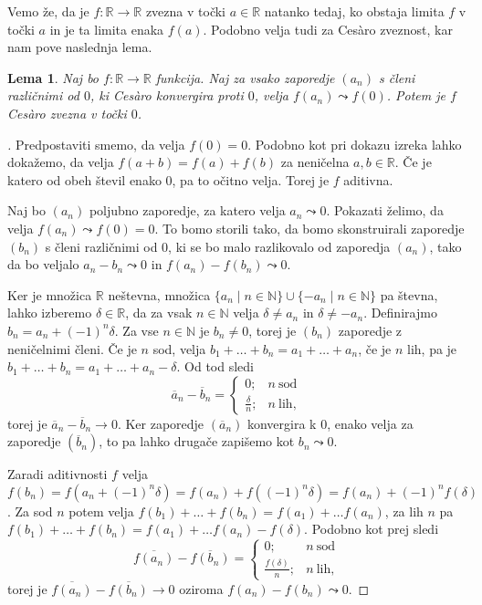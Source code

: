 \documentclass[a4paper,12pt]{article}
\def\N{\mathbb{N}}
\def\R{\mathbb{R}}
\theoremstyle{definition}
\theoremstyle{plain}
\newtheorem{lema}{Lema}
\newenvironment{dokaz}{\begin{proof}[\bfseries\upshape\proofname]}{\end{proof}}
\begin{document}
Vemo že, da je $f: \mathbb{R} \rightarrow \mathbb{R}$ zvezna v točki $a \in \mathbb{R}$ natanko tedaj, ko obstaja limita $f$ v točki $a$ in je ta limita enaka $f(a)$. Podobno velja tudi za Ces\`{a}ro zveznost, kar nam pove naslednja lema.
\begin{lema}
    Naj bo $f: \mathbb{R} \rightarrow \mathbb{R}$ funkcija. Naj za vsako zaporedje $(a_n)$ s členi različnimi od $0$, ki Ces\`{a}ro konvergira proti $0$, velja $f(a_n) \leadsto f(0)$. Potem je $f$ Ces\`{a}ro zvezna v točki $0$.
\end{lema}
\begin{dokaz}
    Predpostaviti smemo, da velja $f(0) = 0$. Podobno kot pri dokazu izreka lahko dokažemo, da velja $f(a+b) = f(a) + f(b)$ za neničelna $a, b \in \mathbb{R}$. Če je katero od obeh števil enako $0$, pa to očitno velja. Torej je $f$ aditivna. 
    
    Naj bo $(a_n)$ poljubno zaporedje, za katero velja $a_n \leadsto 0$. Pokazati želimo, da velja $f(a_n) \leadsto f(0) = 0$. To bomo storili tako, da bomo skonstruirali zaporedje $(b_n)$ s členi različnimi od $0$, ki se bo malo razlikovalo od zaporedja $(a_n)$, tako da bo veljalo $a_n - b_n \leadsto 0$ in $f(a_n) - f(b_n) \leadsto 0$.

    Ker je množica $\R$ neštevna, množica $\{a_n \mid n \in \N\} \cup \{-a_n \mid n \in \N\}$ pa števna, lahko izberemo $\delta \in \R$, da za vsak $n \in \N$ velja $\delta \neq a_n$ in $\delta \neq -a_n$. Definirajmo $b_n = a_n + (-1)^n \delta$. Za vse $n \in \N$ je $b_n \neq 0$, torej je $(b_n)$ zaporedje z neničelnimi členi. Če je $n$ sod, velja $b_1 + \ldots + b_n = a_1 + \ldots + a_n$, če je $n$ lih, pa je $b_1 + \ldots + b_n = a_1 + \ldots + a_n - \delta$. Od tod sledi
    $$
    \overline{a}_n - \overline{b}_n = \begin{cases}
        0; & n \ \text{sod}\\
        \frac{\delta}{n}; & n \ \text{lih},
    \end{cases}
    $$
    torej je $\overline{a}_n - \overline{b}_n \rightarrow 0$. Ker zaporedje $(\overline{a}_n)$ konvergira k 0, enako velja za zaporedje $(\overline{b}_n)$, to pa lahko drugače zapišemo kot $b_n \leadsto 0$.

    Zaradi aditivnosti $f$ velja $f(b_n) = f(a_n + (-1)^n \delta) = f(a_n) + f((-1)^n \delta) = f(a_n) + (-1)^n f(\delta)$. Za sod $n$ potem velja $f(b_1) + \ldots + f(b_n) = f(a_1) + \ldots f(a_n)$, za lih $n$ pa $f(b_1) + \ldots + f(b_n) = f(a_1) + \ldots f(a_n) - f(\delta)$. Podobno kot prej sledi
    $$
    \overline{f(a_n)} - \overline{f(b_n)} = \begin{cases}
        0; & n \ \text{sod}\\
        \frac{f(\delta)}{n}; & n \ \text{lih},
    \end{cases}
    $$
    torej je $\overline{f(a_n)} - \overline{f(b_n)} \rightarrow 0$ oziroma $f(a_n) - f(b_n) \leadsto 0$.


\end{dokaz}
\end{document}
